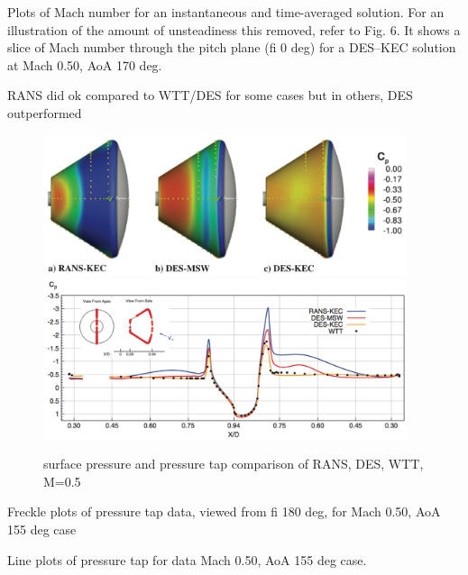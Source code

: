 \documentclass[journal]{new-aiaa}
\begin{document}
Plots of Mach number for an instantaneous and time-averaged solution.
For an illustration of the amount of unsteadiness this removed, refer to Fig. 6. It shows a slice of Mach number through the pitch plane (fi   0 deg) for a DES–KEC solution at Mach 0.50, AoA   170 deg.



RANS did ok compared to WTT/DES for some cases but in others, DES outperformed


\begin{figure}[H]
\begin{center}
\includegraphics[width=0.95\textwidth]{Images/logan/schwing2015detachededdy_surfacepressure.pdf}
\includegraphics[width=0.95\textwidth]{Images/logan/schwing2015detachededdy_surfacetaps.pdf}
\caption{ surface pressure and pressure tap comparison of RANS, DES, WTT, M=0.5 \cite{schwing2015detachededdy} }
\label{fig:orionpressure}
\end{center}
\end{figure}




Freckle plots of pressure tap data, viewed from fi  180 deg, for Mach 0.50, AoA   155 deg case

Line plots of pressure tap for data Mach 0.50, AoA   155 deg case.
\end{document}
